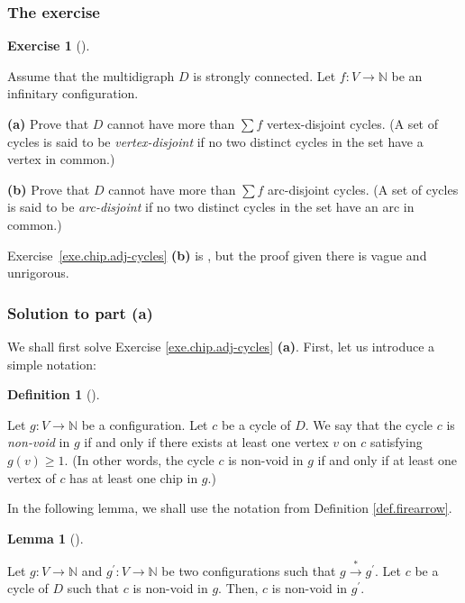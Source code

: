 \documentclass[numbers=enddot,12pt,final,onecolumn,notitlepage]{scrartcl}%
\newcounter{exer}
\theoremstyle{definition}
\newtheorem{lem}[theo]{Lemma}
\newenvironment{lemma}[1][]
{\begin{lem}[#1]\begin{leftbar}}
{\end{leftbar}\end{lem}}
\newtheorem{defi}[theo]{Definition}
\newenvironment{definition}[1][]
{\begin{defi}[#1]\begin{leftbar}}
{\end{leftbar}\end{defi}}
\newtheorem{exmp}[exer]{Exercise}
\newenvironment{exercise}[1][]
{\begin{exmp}[#1]\begin{leftbar}}
{\end{leftbar}\end{exmp}}
\let\sumnonlimits\sum
\renewcommand{\sum}{\sumnonlimits\limits}
\newcommand{\NN}{\mathbb{N}}
\newcommand{\tup}[1]{\left( #1 \right)}
\begin{document}
\subsubsection{The exercise}


\begin{exercise} \label{exe.chip.adj-cycles}
Assume that the multidigraph $D$ is strongly connected.
Let $f : V \to \NN$ be an infinitary configuration.

\textbf{(a)} Prove that $D$ cannot have more than
$\sum f$ vertex-disjoint cycles.
(A set of cycles is said to be \textit{vertex-disjoint}
if no two distinct cycles in the set have a vertex in
common.)

\textbf{(b)} Prove that $D$ cannot have more than
$\sum f$ arc-disjoint cycles.
(A set of cycles is said to be \textit{arc-disjoint}
if no two distinct cycles in the set have an arc in
common.)
\end{exercise}

Exercise~\ref{exe.chip.adj-cycles} \textbf{(b)} is
\cite[Theorem 2.2]{BjoLov92}, but the proof given there
is vague and unrigorous.

\subsubsection{Solution to part \textbf{(a)}}

We shall first solve Exercise \ref{exe.chip.adj-cycles} \textbf{(a)}.
First, let us introduce a simple notation:

\begin{definition}
\label{def.chip.cycle-non-void}Let $g:V\rightarrow\mathbb{N}$ be a
configuration. Let $c$ be a cycle of $D$. We say that the cycle $c$ is
\textit{non-void} in $g$ if and only if there exists at least one vertex $v$
on $c$ satisfying $g\left(  v\right)  \geq1$. (In other words, the cycle $c$
is non-void in $g$ if and only if at least one vertex of $c$ has at least one
chip in $g$.)
\end{definition}

In the following lemma, we shall use the notation from Definition
\ref{def.firearrow}.

\begin{lemma}
\label{lem.chip.adj-cycles.cycles-preserve}Let $g:V\rightarrow\mathbb{N}$ and
$g^{\prime}:V\rightarrow\mathbb{N}$ be two configurations such that
$g\overset{\ast}{\rightarrow}g^{\prime}$. Let $c$ be a cycle of $D$ such that
$c$ is non-void in $g$. Then, $c$ is non-void in $g^{\prime}$.
\end{lemma}
\end{document}
